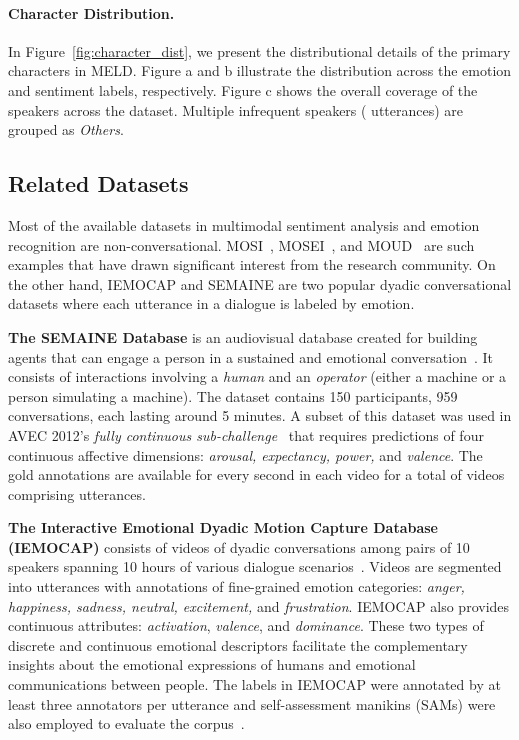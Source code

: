 \documentclass[11pt,a4paper]{article}
\begin{document}
\paragraph{Character Distribution.}
In Figure~\ref{fig:character_dist}, we present the distributional details of the primary characters in MELD. Figure a and b illustrate the distribution across the emotion and sentiment labels, respectively. Figure c shows the overall coverage of the speakers across the dataset. Multiple infrequent speakers ( utterances) are grouped as \textit{Others}. 


\subsection{Related Datasets}
\label{sec:rel}
Most of the available datasets in multimodal sentiment analysis and emotion recognition are non-conversational. MOSI~\cite{zadeh2016multimodal}, MOSEI~\cite{zadeh2018multimodal}, and MOUD~\cite{perez2013utterance} are such examples that have drawn significant interest from the research community. On the other hand, IEMOCAP and SEMAINE are two popular dyadic conversational datasets where each utterance in a dialogue is labeled by emotion.

\textbf{The SEMAINE Database} 
is an audiovisual database created for building agents that can engage a person in a sustained and emotional conversation~\cite{mckeown2012semaine}. It consists of interactions involving a \textit{human} and an \textit{operator} (either a machine or a person simulating a machine). The dataset contains 150 participants, 959 conversations, each lasting around 5 minutes. A subset of this dataset was used in AVEC 2012's \textit{fully continuous sub-challenge}~\cite{schuller2012avec} that requires predictions of four continuous affective dimensions: \textit{arousal, expectancy, power,} and \textit{valence}. The gold annotations are available for every  second in each video for a total of  videos comprising  utterances. 




\textbf{The Interactive Emotional Dyadic Motion Capture Database (IEMOCAP)} consists of videos of dyadic conversations among pairs of 10 speakers spanning 10 hours of various dialogue scenarios~\cite{iemocap}. Videos are segmented into utterances with annotations of fine-grained emotion categories: \textit{anger, happiness, sadness, neutral, excitement,} and \textit{frustration}. IEMOCAP also provides continuous attributes: \textit{activation}, \textit{valence}, and \textit{dominance}. These two types of discrete and continuous emotional descriptors facilitate the complementary insights about the emotional expressions of humans and emotional communications between people. The labels in IEMOCAP were annotated by at least three annotators per utterance and self-assessment manikins (SAMs) were also employed to evaluate the corpus~\cite{bradley1994measuring}.
\end{document}
